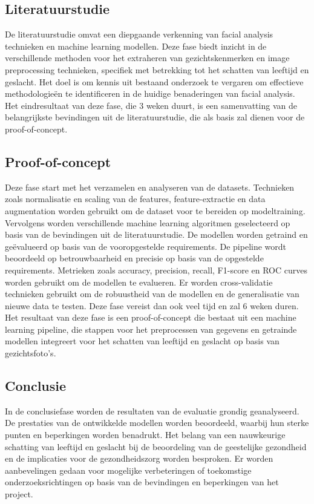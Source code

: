\subsection{Literatuurstudie}
\label{sub:vliteratuurstudie}
De literatuurstudie omvat een diepgaande verkenning van facial analysis technieken en machine learning modellen. 
Deze fase biedt inzicht in de verschillende methoden voor het extraheren van gezichtskenmerken en image preprocessing technieken, specifiek met betrekking tot het schatten van leeftijd en geslacht.
Het doel is om kennis uit bestaand onderzoek te vergaren om effectieve methodologieën te identificeren in de huidige benaderingen van facial analysis. 
Het eindresultaat van deze fase, die 3 weken duurt, is een samenvatting van de belangrijkste bevindingen uit de literatuurstudie, die als basis zal dienen voor de proof-of-concept.
\subsection{Proof-of-concept}
\label{sub:vproof-of-concept}
Deze fase start met het verzamelen en analyseren van de datasets. Technieken zoals normalisatie en scaling van de features, feature-extractie en data augmentation worden gebruikt om de dataset voor te bereiden op modeltraining.
Vervolgens worden verschillende machine learning algoritmen geselecteerd op basis van de bevindingen uit de literatuurstudie. De modellen worden getraind en geëvalueerd op basis van de vooropgestelde requirements. 
De pipeline wordt beoordeeld op betrouwbaarheid en precisie op basis van de opgestelde requirements. Metrieken zoals accuracy, precision, recall, F1-score en ROC curves worden gebruikt om de modellen te evalueren.
Er worden cross-validatie technieken gebruikt om de robuustheid van de modellen en de generalisatie van nieuwe data te testen. 
Deze fase vereist dan ook veel tijd en zal 6 weken duren. Het resultaat van deze fase is een proof-of-concept die bestaat uit een machine learning pipeline, die stappen voor het preprocessen van gegevens en getrainde modellen integreert voor het schatten van leeftijd en geslacht op basis van gezichtsfoto's.

\subsection{Conclusie}
\label{sub:vconclusie}
In de conclusiefase worden de resultaten van de evaluatie grondig geanalyseerd. De prestaties van de ontwikkelde modellen worden beoordeeld, waarbij hun sterke punten en beperkingen worden benadrukt. Het belang van een nauwkeurige schatting van leeftijd en geslacht bij de beoordeling van de geestelijke gezondheid en de implicaties voor de gezondheidszorg worden besproken. Er worden aanbevelingen gedaan voor mogelijke verbeteringen of toekomstige onderzoeksrichtingen op basis van de bevindingen en beperkingen van het project.
